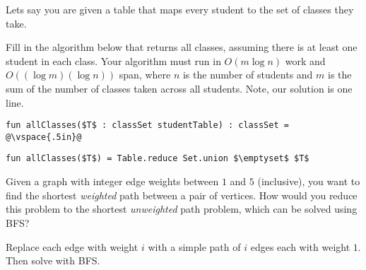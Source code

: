 \begin{cluster}
\label{grp:prb:practice-exam-ii::classes}

\begin{problem}[4][Classes]
\label{prb:practice-exam-ii::classes}


Lets say you are given a table that maps every student to the set of
classes they take. 
\freeresponse \label{prb:practice-exam-ii::fill}

Fill in the algorithm below that returns all classes,
assuming there is at least one student in each class.  Your algorithm
must run in $O(m \log n)$ work and $O((\log m)(\log n))$ span, where
$n$ is the number of students and $m$ is the sum of the number of
classes taken across all students.    Note, our solution is one line.


\vspace{.3in}
\begin{lstlisting}[numbers=none]
fun allClasses($T$ : classSet studentTable) : classSet = 
@\vspace{.5in}@
\end{lstlisting}


\sol \label{\sol:practice-exam-ii::numbers}

\begin{lstlisting}[numbers=none]
fun allClasses($T$) = Table.reduce Set.union $\emptyset$ $T$
\end{lstlisting}


\end{problem}
\end{cluster}

\begin{cluster}
\label{grp:prb:practice-exam-ii::shortest-weighted}

\begin{problem}
\label{prb:practice-exam-ii::shortest-weighted}
\freeresponse \label{prb:practice-exam-ii::given}


Given a graph with integer edge weights between $1$ and $5$
(inclusive), you want to find the shortest \emph{weighted} path
between a pair of vertices.  How would you reduce this problem to the
shortest \emph{unweighted} path problem, which can be solved using
BFS?


\sol \label{\sol:practice-exam-ii::replace}

  Replace each edge with weight $i$ with a simple path of $i$ edges
  each with weight $1$. Then solve with BFS.

\end{problem}
\end{cluster}

